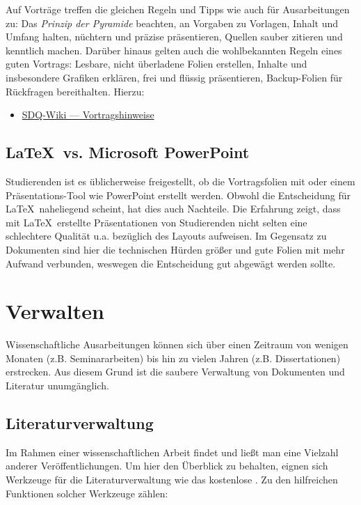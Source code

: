 Auf Vorträge treffen die gleichen Regeln und Tipps wie auch für Ausarbeitungen zu: Das \emph{Prinzip der Pyramide} beachten, an Vorgaben zu Vorlagen, Inhalt und Umfang halten, nüchtern und präzise präsentieren, Quellen sauber zitieren und kenntlich machen.
Darüber hinaus gelten auch die wohlbekannten Regeln eines guten Vortrags: Lesbare, nicht überladene Folien erstellen, Inhalte und insbesondere Grafiken erklären, frei und flüssig präsentieren, Backup-Folien für Rückfragen bereithalten. Hierzu:

\smallskip
\begin{itemize}[label={\symbolInfo}]
    \item \href{https://sdqweb.ipd.kit.edu/wiki/Vortragshinweise}{SDQ-Wiki --- Vortragshinweise}
\end{itemize}

\subsection{\LaTeX\ vs. Microsoft PowerPoint}%
\label{sec:Praesentieren:PowerPoint}

Studierenden ist es üblicherweise freigestellt, ob die Vortragsfolien mit  oder einem Präsentations-Tool wie PowerPoint erstellt werden.
Obwohl die Entscheidung für \LaTeX\ naheliegend scheint, hat dies auch Nachteile.
Die Erfahrung zeigt, dass mit \LaTeX\ erstellte Präsentationen von Studierenden nicht selten eine schlechtere Qualität u.a. bezüglich des Layouts aufweisen.
Im Gegensatz zu Dokumenten sind hier die technischen Hürden größer und gute Folien mit mehr Aufwand verbunden, weswegen die Entscheidung gut abgewägt werden sollte.


\section{Verwalten}%
\label{sec:Verwalten}

Wissenschaftliche Ausarbeitungen können sich über einen Zeitraum von wenigen Monaten (z.B. Seminararbeiten) bis hin zu vielen Jahren (z.B. Dissertationen) erstrecken.
Aus diesem Grund ist die saubere Verwaltung von Dokumenten und Literatur unumgänglich.

\subsection{Literaturverwaltung}%
\label{sec:Verwalten:Literatur}

Im Rahmen einer wissenschaftlichen Arbeit findet und ließt man eine Vielzahl anderer Veröffentlichungen.
Um hier den Überblick zu behalten, eignen sich Werkzeuge für die Literaturverwaltung wie das kostenlose .
Zu den hilfreichen Funktionen solcher Werkzeuge zählen:

